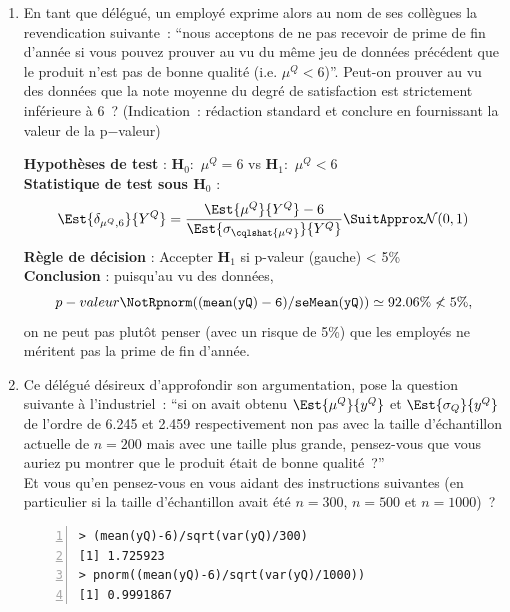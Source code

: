 \documentclass[10pt]{report}
\begin{document}
\begin{exercice}
\begin{enumerate}
\begin{Correction}
Du point de vue des employés, l'erreur la plus grave correspond à celle de ne pas être récompensé à tort.
\end{Correction}


\item En tant que d{\'e}l{\'e}gu{\'e}, un employé exprime alors au nom de ses coll{\`e}gues la revendication suivante~: ``nous acceptons de ne pas recevoir de prime de fin d'ann{\'e}e si vous pouvez prouver au vu du m{\^e}me jeu de donn{\'e}es pr{\'e}c{\'e}dent que le produit n'est pas de bonne qualit{\'e} (i.e. $\mu^Q<6$)''. Peut-on prouver au vu des donn{\'e}es que la note moyenne du degr{\'e} de satisfaction est strictement inf{\'e}rieure {\`a} 6~? (Indication~: r{\'e}daction standard et conclure en fournissant la valeur de la p$-$valeur)


\begin{Correction}

\noindent \textbf{Hypothèses de test} : $\mathbf{H}_0:$ $\mu^{Q}=6$ vs {\large $\mathbf{H}_1:$ $\mu^{Q}<6$}\\
\textbf{Statistique de test sous $\mathbf{H}_0$} :
  $$
  \Est{\delta_{\mu^{Q},6}}{Y^{Q}}= {\displaystyle \frac{\Est{\mu^{Q}}{Y^{Q}}-6}{
\Est{\sigma_{\cqlshat{\mu^{Q}}}}{Y^{Q}}
}} 
  \SuitApprox \mathcal{N}(0,1)
  $$
\textbf{Règle de décision} : Accepter $\mathbf{H}_1$ si 
  p-valeur (gauche) < 5\%\\
\noindent \textbf{Conclusion} :
puisqu'au vu des données, 
  \[
p-valeur\NotR\mathtt{pnorm((mean(yQ)-6)/seMean(yQ))} \simeq 92.06\%\nless5\%,
\]
on ne peut pas plutôt penser (avec un risque de 5\%) que les employés ne méritent pas la prime de fin d'année.
\end{Correction}
 

\item Ce d{\'e}l{\'e}gu{\'e} d{\'e}sireux d'approfondir son argumentation, pose la question suivante {\`a} l'industriel~: ``si on avait obtenu $\Est{\mu^Q}{y^Q}$ et $\Est{\sigma_{Q}}{y^Q}$ de l'ordre de 6.245 et 2.459 respectivement non pas avec la taille d'{\'e}chantillon actuelle de $n=200$ mais avec une taille plus grande, pensez-vous que vous auriez pu montrer que le produit {\'e}tait de bonne qualit{\'e}~?''\\
Et vous qu'en pensez-vous en vous aidant des instructions suivantes (en particulier si la taille d'{\'e}chantillon avait {\'e}t{\'e} $n=300$, $n=500$ et $n=1000$)~?

\begin{Verbatim}[frame=leftline,fontfamily=tt,fontshape=n,numbers=left]
> (mean(yQ)-6)/sqrt(var(yQ)/300)
[1] 1.725923
> pnorm((mean(yQ)-6)/sqrt(var(yQ)/1000))
[1] 0.9991867
\end{Verbatim}




\end{enumerate}
\end{exercice}
\end{document}
